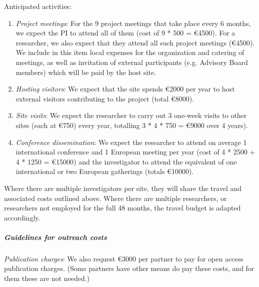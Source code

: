 Anticipated activities:

\begin{enumerate}
\item \emph{Project meetings}: For the 9 project meetings that take place every 6 months, we expect
the PI to attend all of them (cost of 9 * 500 = \euro{4500}). For
a researcher, we also expect that they attend all such project meetings
(\euro{4500}). We include in this item local expenses for the
organization and catering of meetings, as well as invitation of
external participants (e.g. Advisory Board members) which will be paid
by the host site.

\item \emph{Hosting visitors}: We expect that the site spends \euro{2000} per year to host
external visitors contributing to the project (total \euro{8000}).

\item \emph{Site visits}: We expect the researcher to carry out 3 one-week visits to other sites
(each at \euro{750}) every year, totalling 3 * 4 * 750 = \euro{9000}
over 4 years).

\item
\emph{Conference dissemination}: We expect the researcher to attend on average 1
international conference and 1 European meeting per year (cost of 4 *
2500 + 4 * 1250 = \euro{15000}) and the investigator to attend the
equivalent of one international or two
European gatherings (totals \euro{10000}).


\end{enumerate}

Where there are multiple investigators per site, they will share the
travel and associated costs outlined above. Where there are multiple
researchers, or researchers not employed for the full 48 months, the
travel budget is adapted accordingly.



\subparagraph{Guidelines for outreach costs}

\label{sect:budget-outreach-publication-charges}
\emph{Publication charges}: We also request \euro{3000} per partner to pay for open
access publication charges.  (Some partners have other means do pay
these costs, and for them these are not needed.)

